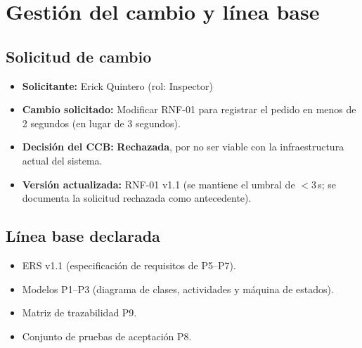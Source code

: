 \documentclass[11pt,a4paper]{article}
\begin{document}
\section{Gesti\'on del cambio y l\'inea base}

\subsection*{Solicitud de cambio}
\begin{itemize}[nosep]
    \item \textbf{Solicitante:} Erick Quintero (rol: Inspector)
    \item \textbf{Cambio solicitado:} Modificar RNF-01 para registrar el pedido en menos de 2 segundos (en lugar de 3 segundos).
   
    \item \textbf{Decisi\'on del CCB:} \textbf{Rechazada}, por no ser viable con la infraestructura actual del sistema.
    \item \textbf{Versi\'on actualizada:} RNF-01 v1.1 (se mantiene el umbral de $<3$\,s; se documenta la solicitud rechazada como antecedente).
\end{itemize}

\subsection*{L\'inea base declarada}

\begin{itemize}[nosep]
    \item ERS v1.1 (especificaci\'on de requisitos de P5--P7).
    \item Modelos P1--P3 (diagrama de clases, actividades y m\'aquina de estados).
    \item Matriz de trazabilidad P9.
    \item Conjunto de pruebas de aceptaci\'on P8.
\end{itemize}
\end{document}
